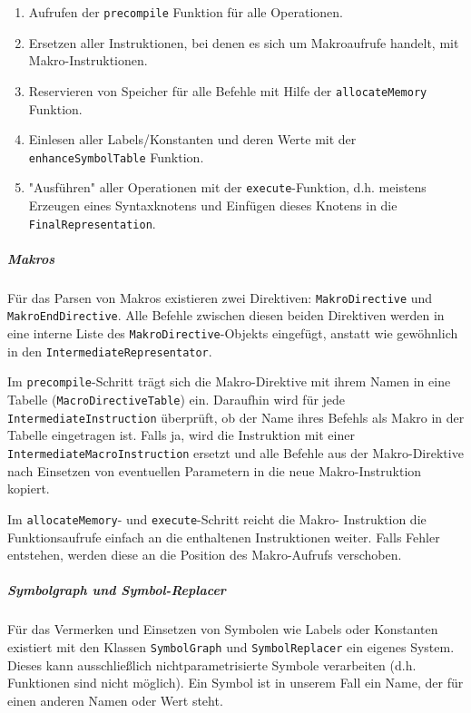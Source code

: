 \begin{enumerate}
	\item Aufrufen der \texttt{precompile} Funktion für alle Operationen. \item
	Ersetzen aller Instruktionen, bei denen es sich um Makroaufrufe handelt, mit
	Makro-Instruktionen. \item Reservieren von Speicher für alle Befehle mit
	Hilfe der \texttt{allocateMemory} Funktion. \item Einlesen aller
	Labels/Konstanten und deren Werte mit der \texttt{enhanceSymbolTable}
	Funktion. \item "Ausführen" aller Operationen mit der
	\texttt{execute}-Funktion, d.h. meistens Erzeugen eines Syntaxknotens und
	Einfügen dieses Knotens in die \texttt{FinalRepresentation}.
\end{enumerate}

\subparagraph{Makros} Für das Parsen von Makros existieren zwei Direktiven:
\texttt{Makro\-Directive} und \texttt{Makro\-End\-Directive}. Alle Befehle
zwischen diesen beiden Direktiven werden in eine interne Liste des
\texttt{Makro\-Directive}-Objekts eingefügt, anstatt wie gewöhnlich in den
\texttt{Intermediate\-Representator}.

Im \texttt{precompile}-Schritt trägt sich die Makro-Direktive mit ihrem Namen in
eine Tabelle (\texttt{Macro\-Directive\-Table}) ein. Daraufhin wird für jede
\texttt{Intermediate\-Instruction} überprüft, ob der Name ihres Befehls als
Makro in der Tabelle eingetragen ist. Falls ja, wird die Instruktion mit einer
\texttt{Intermediate\-Macro\-Instruction} ersetzt und alle Befehle aus der
Makro-Direktive nach Einsetzen von eventuellen Parametern in die neue
Makro-Instruktion kopiert.

Im \texttt{allocateMemory}- und \texttt{execute}-Schritt reicht die Makro-
Instruktion die Funktionsaufrufe einfach an die enthaltenen Instruktionen
weiter. Falls Fehler entstehen, werden diese an die Position des Makro-Aufrufs
verschoben.

\subparagraph{Symbolgraph und Symbol-Replacer} Für das Vermerken und Einsetzen
von Symbolen wie Labels oder Konstanten existiert mit den Klassen
\texttt{SymbolGraph} und \texttt{SymbolReplacer} ein eigenes System. Dieses kann
ausschließlich nichtparametrisierte Symbole verarbeiten (d.h. Funktionen sind
nicht möglich). Ein Symbol ist in unserem Fall ein Name, der für einen anderen
Namen oder Wert steht.

